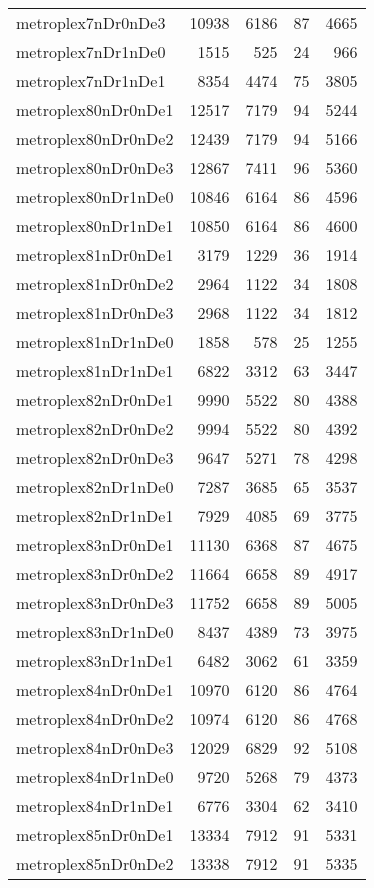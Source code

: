 \begin{longtable}{lrrrr}
metroplex7nDr0nDe3 & 10938 & 6186 & 87 & 4665 \\
metroplex7nDr1nDe0 & 1515 & 525 & 24 & 966 \\
metroplex7nDr1nDe1 & 8354 & 4474 & 75 & 3805 \\
metroplex80nDr0nDe1 & 12517 & 7179 & 94 & 5244 \\
metroplex80nDr0nDe2 & 12439 & 7179 & 94 & 5166 \\
metroplex80nDr0nDe3 & 12867 & 7411 & 96 & 5360 \\
metroplex80nDr1nDe0 & 10846 & 6164 & 86 & 4596 \\
metroplex80nDr1nDe1 & 10850 & 6164 & 86 & 4600 \\
metroplex81nDr0nDe1 & 3179 & 1229 & 36 & 1914 \\
metroplex81nDr0nDe2 & 2964 & 1122 & 34 & 1808 \\
metroplex81nDr0nDe3 & 2968 & 1122 & 34 & 1812 \\
metroplex81nDr1nDe0 & 1858 & 578 & 25 & 1255 \\
metroplex81nDr1nDe1 & 6822 & 3312 & 63 & 3447 \\
metroplex82nDr0nDe1 & 9990 & 5522 & 80 & 4388 \\
metroplex82nDr0nDe2 & 9994 & 5522 & 80 & 4392 \\
metroplex82nDr0nDe3 & 9647 & 5271 & 78 & 4298 \\
metroplex82nDr1nDe0 & 7287 & 3685 & 65 & 3537 \\
metroplex82nDr1nDe1 & 7929 & 4085 & 69 & 3775 \\
metroplex83nDr0nDe1 & 11130 & 6368 & 87 & 4675 \\
metroplex83nDr0nDe2 & 11664 & 6658 & 89 & 4917 \\
metroplex83nDr0nDe3 & 11752 & 6658 & 89 & 5005 \\
metroplex83nDr1nDe0 & 8437 & 4389 & 73 & 3975 \\
metroplex83nDr1nDe1 & 6482 & 3062 & 61 & 3359 \\
metroplex84nDr0nDe1 & 10970 & 6120 & 86 & 4764 \\
metroplex84nDr0nDe2 & 10974 & 6120 & 86 & 4768 \\
metroplex84nDr0nDe3 & 12029 & 6829 & 92 & 5108 \\
metroplex84nDr1nDe0 & 9720 & 5268 & 79 & 4373 \\
metroplex84nDr1nDe1 & 6776 & 3304 & 62 & 3410 \\
metroplex85nDr0nDe1 & 13334 & 7912 & 91 & 5331 \\
metroplex85nDr0nDe2 & 13338 & 7912 & 91 & 5335 \\

\end{longtable}
